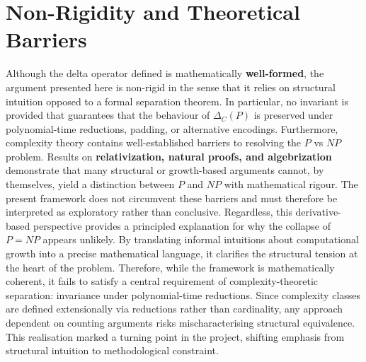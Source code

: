 \documentclass{article}
\begin{document}
\section{Non-Rigidity and Theoretical Barriers}
Although the delta operator defined is mathematically \textbf{well-formed}, the argument presented here is non-rigid in the sense that it relies on structural intuition opposed to a formal separation theorem.
In particular, no invariant is provided that guarantees that the behaviour of $\Delta_C(P)$ is preserved under polynomial-time reductions, padding, or alternative encodings.
Furthermore, complexity theory contains well-established barriers to resolving the $P$ vs $NP$ problem.
Results on \textbf{relativization, natural proofs, and algebrization} demonstrate that many structural or growth-based arguments cannot, by themselves, yield a distinction between $P$ and $NP$ with mathematical rigour.
The present framework does not circumvent these barriers and must therefore be interpreted as exploratory rather than conclusive.
Regardless, this derivative-based perspective provides a principled explanation for why the collapse of $P = NP$ appears unlikely.
By translating informal intuitions about computational growth into a precise mathematical language, it clarifies the structural tension at the heart of the problem.
Therefore, while the framework is mathematically coherent, it fails to satisfy a central requirement of complexity-theoretic separation: invariance under polynomial-time reductions.
Since complexity classes are defined extensionally via reductions rather than cardinality, any approach dependent on counting arguments risks mischaracterising structural equivalence.
This realisation marked a turning point in the project, shifting emphasis from structural intuition to methodological constraint.
\end{document}
